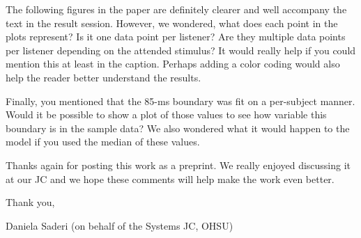 \documentclass[10pt]{article}
\begin{document}
The following figures in the paper are definitely clearer and well
accompany the text in the result session. However, we wondered, what
does each point in the plots represent? Is it one data point per
listener? Are they multiple data points per listener depending on the
attended stimulus? It would really help if you could mention this at
least in the caption. Perhaps adding a color coding would also help the
reader better understand the results.

Finally, you mentioned that the 85-ms boundary was fit on a per-subject
manner. Would it be possible to show a plot of those values to see how
variable this boundary is in the sample data? We also wondered what it
would happen to the model if you used the median of these values.

Thanks again for posting this work as a preprint. We really enjoyed
discussing it at our JC and we hope these comments will help make the
work even better.

Thank you,

Daniela Saderi (on behalf of the Systems JC, OHSU)

\FloatBarrier
\end{document}
